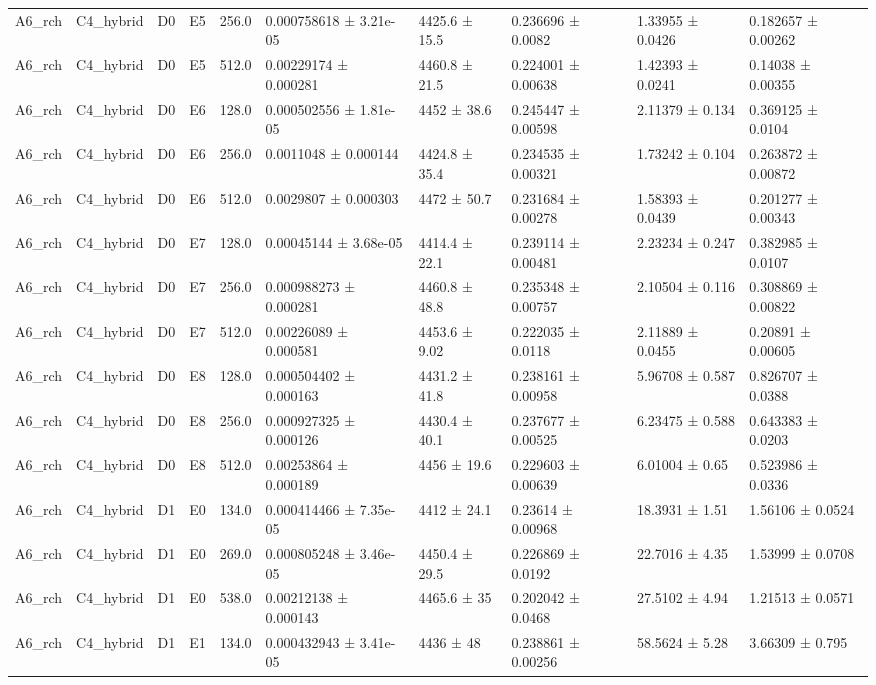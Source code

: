 \begin{table}
\begin{tabular}{llllllllll}
A6\_rch & C4\_hybrid & D0 & E5 & 256.0 & 0.000758618 ± 3.21e-05 & 4425.6 ± 15.5 & 0.236696 ± 0.0082 & 1.33955 ± 0.0426 & 0.182657 ± 0.00262 \\
A6\_rch & C4\_hybrid & D0 & E5 & 512.0 & 0.00229174 ± 0.000281 & 4460.8 ± 21.5 & 0.224001 ± 0.00638 & 1.42393 ± 0.0241 & 0.14038 ± 0.00355 \\
A6\_rch & C4\_hybrid & D0 & E6 & 128.0 & 0.000502556 ± 1.81e-05 & 4452 ± 38.6 & 0.245447 ± 0.00598 & 2.11379 ± 0.134 & 0.369125 ± 0.0104 \\
A6\_rch & C4\_hybrid & D0 & E6 & 256.0 & 0.0011048 ± 0.000144 & 4424.8 ± 35.4 & 0.234535 ± 0.00321 & 1.73242 ± 0.104 & 0.263872 ± 0.00872 \\
A6\_rch & C4\_hybrid & D0 & E6 & 512.0 & 0.0029807 ± 0.000303 & 4472 ± 50.7 & 0.231684 ± 0.00278 & 1.58393 ± 0.0439 & 0.201277 ± 0.00343 \\
A6\_rch & C4\_hybrid & D0 & E7 & 128.0 & 0.00045144 ± 3.68e-05 & 4414.4 ± 22.1 & 0.239114 ± 0.00481 & 2.23234 ± 0.247 & 0.382985 ± 0.0107 \\
A6\_rch & C4\_hybrid & D0 & E7 & 256.0 & 0.000988273 ± 0.000281 & 4460.8 ± 48.8 & 0.235348 ± 0.00757 & 2.10504 ± 0.116 & 0.308869 ± 0.00822 \\
A6\_rch & C4\_hybrid & D0 & E7 & 512.0 & 0.00226089 ± 0.000581 & 4453.6 ± 9.02 & 0.222035 ± 0.0118 & 2.11889 ± 0.0455 & 0.20891 ± 0.00605 \\
A6\_rch & C4\_hybrid & D0 & E8 & 128.0 & 0.000504402 ± 0.000163 & 4431.2 ± 41.8 & 0.238161 ± 0.00958 & 5.96708 ± 0.587 & 0.826707 ± 0.0388 \\
A6\_rch & C4\_hybrid & D0 & E8 & 256.0 & 0.000927325 ± 0.000126 & 4430.4 ± 40.1 & 0.237677 ± 0.00525 & 6.23475 ± 0.588 & 0.643383 ± 0.0203 \\
A6\_rch & C4\_hybrid & D0 & E8 & 512.0 & 0.00253864 ± 0.000189 & 4456 ± 19.6 & 0.229603 ± 0.00639 & 6.01004 ± 0.65 & 0.523986 ± 0.0336 \\
A6\_rch & C4\_hybrid & D1 & E0 & 134.0 & 0.000414466 ± 7.35e-05 & 4412 ± 24.1 & 0.23614 ± 0.00968 & 18.3931 ± 1.51 & 1.56106 ± 0.0524 \\
A6\_rch & C4\_hybrid & D1 & E0 & 269.0 & 0.000805248 ± 3.46e-05 & 4450.4 ± 29.5 & 0.226869 ± 0.0192 & 22.7016 ± 4.35 & 1.53999 ± 0.0708 \\
A6\_rch & C4\_hybrid & D1 & E0 & 538.0 & 0.00212138 ± 0.000143 & 4465.6 ± 35 & 0.202042 ± 0.0468 & 27.5102 ± 4.94 & 1.21513 ± 0.0571 \\
A6\_rch & C4\_hybrid & D1 & E1 & 134.0 & 0.000432943 ± 3.41e-05 & 4436 ± 48 & 0.238861 ± 0.00256 & 58.5624 ± 5.28 & 3.66309 ± 0.795 \\

\end{tabular}
\end{table}
